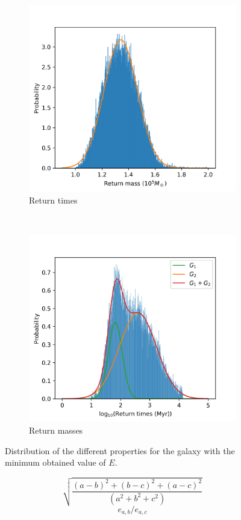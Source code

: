 	\begin{figure}[h]
		\centering
		\begin{subfigure}[t]{0.49\textwidth}
			\includegraphics[width = \textwidth]{"../Files/Week 13/dist_masses"}
			\caption{Return times}
		\end{subfigure}
		~ 
		\begin{subfigure}[t]{0.49\textwidth}
			\includegraphics[width=\textwidth]{"../Files/Week 13/dist_times"}
			\caption{Return masses}
		\end{subfigure}
		\caption{Distribution of the different properties for the galaxy with the minimum obtained value of $E$.}
	\end{figure}

	\begin{equation}
		\sqrt{\dfrac{(a - b)^2 + (b - c)^2 + (a - c)^2}{(a^2 + b^2 + c^2)}}
	\end{equation}
	\begin{equation}
		e_{a, b} / e_{a, c}
	\end{equation}